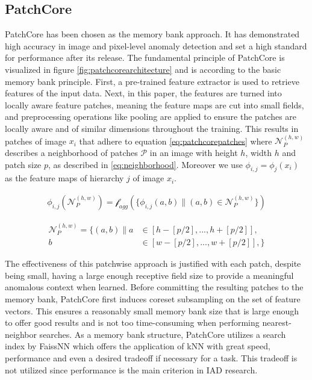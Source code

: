 \subsection{PatchCore}
\label{subsec:patchcore}
PatchCore \cite{patchCore2022} has been chosen as the memory bank approach. It has demonstrated high accuracy in image and pixel-level anomaly detection and set a high standard for 
performance after its release. The fundamental principle of PatchCore is visualized in figure \ref{fig:patchcorearchitecture} and is according to the basic memory bank principle. First, a pre-trained feature extractor is used 
to retrieve features of the input data. Next, in this paper, the features are turned into locally aware feature patches, meaning the feature maps are cut into small fields, and preprocessing operations like pooling are applied to ensure 
the patches are locally aware and of similar dimensions throughout the training. This results in patches of image $x_i$ that adhere to equation \ref{eq:patchcorepatches} where $\mathcal{N}_{P}^{(h,w)}$ 
describes a neighborhood of patches $\mathcal{P}$ in an image with height $h$, width $h$ and patch size $p$, as described in \ref{eq:neighborhood}. Moreover we use $\phi_{i,j} = \phi_j(x_i)$ as the feature 
maps of hierarchy $j$ of image $x_i$.

\begin{equation}
\label{eq:patchcorepatches}
\begin{split}
\phi_{i,j} (\mathcal{N}_{P}^{(h,w)}) = \mathcal{f}_{agg}(\{ \phi_{i,j}(a,b) \| (a,b) \in \mathcal{N}_{P}^{(h,w)} \})
\end{split}
\end{equation}

\begin{equation}
 \label{eq:neighborhood}
 \begin{split}
\mathcal{N}_{P}^{(h,w)} = \{ (a,b) \| a & \in [h - [p/2], ..., h + [p/2]], \\
 b & \in [w - [p/2], ..., w + [p/2]], \}
 \end{split}
\end{equation}

The effectiveness of this patchwise approach is justified with each patch, despite being small, having a large enough receptive field size to provide a meaningful anomalous context when learned. 
Before committing the resulting patches to the memory bank, PatchCore first induces coreset subsampling on the set of feature vectors. This ensures a reasonably small memory bank size that is 
large enough to offer good results and is not too time-consuming when performing nearest-neighbor searches. As a memory bank structure, PatchCore utilizes a search index by FaissNN \cite{douze2024faissnn}
which offers the application of kNN with great speed, performance and even a desired tradeoff if necessary for a task. This tradeoff is not utilized since performance is the main criterion in IAD research. 

